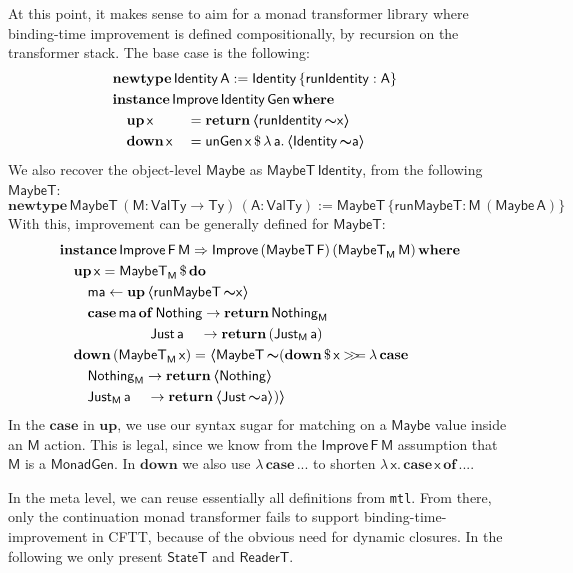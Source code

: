 \documentclass[acmsmall,screen,review,anonymous]{acmart}
\newcommand{\mit}[1]{{\mathsf{#1}}}
\newcommand{\msf}[1]{{\mathsf{#1}}}
\newcommand{\mbf}[1]{{\mathbf{#1}}}
\newcommand{\bs}[1]{\boldsymbol{#1}}
\newcommand{\mdo}{\mbf{do}\,}
\newcommand{\ind}{\hspace{1em}}
\newcommand{\return}{\mbf{return}\,}
\newcommand{\lam}{\lambda\,}
\newcommand{\where}{\mbf{where}}
\newcommand{\M}{\msf{M}}
\newcommand{\of}{\mbf{of}\,}
\newcommand{\vma}{\mathsf{ma}}
\newcommand{\vA}{\mathsf{A}}
\newcommand{\vF}{\mathsf{F}}
\newcommand{\vM}{\mathsf{M}}
\newcommand{\va}{\mathsf{a}}
\newcommand{\vx}{\mathsf{x}}
\newcommand{\ReaderT}{\msf{ReaderT}}
\newcommand{\fro}{\leftarrow}
\newcommand{\case}{\mbf{case\,}}
\newcommand{\spl}{{\bs{\sim}}}
\newcommand{\ql}{{\bs{\langle}}}
\newcommand{\qr}{{\bs{\rangle}}}
\newcommand{\bind}{\mathbin{>\!\!>\mkern-6.7mu=}}
\newcommand{\VTy}{\msf{ValTy}}
\newcommand{\Ty}{\msf{Ty}}
\newcommand{\Maybe}{\msf{Maybe}}
\newcommand{\MaybeT}{\msf{MaybeT}}
\newcommand{\Nothing}{\msf{Nothing}}
\newcommand{\Just}{\msf{Just}}
\theoremstyle{remark}
\newcommand{\mup}{\mbf{up}}
\newcommand{\mdown}{\mbf{down}}
\newcommand{\instance}{\mbf{instance}\,}
\newcommand{\Improve}{\msf{Improve}}
\newcommand{\Gen}{\msf{Gen}}
\newcommand{\unGen}{\mit{unGen}}
\newcommand{\qt}[1]{\ql#1\qr}
\newcommand{\MonadGen}{\msf{MonadGen}}
\newcommand{\RA}{\Rightarrow}
\newcommand{\StateT}{\msf{StateT}}
\newcommand{\Identity}{\msf{Identity}}
\newcommand{\runIdentity}{\mit{runIdentity}}
\newcommand{\newtype}{\mbf{newtype}\,}
\newcommand{\runMaybeT}{\mit{runMaybeT}}
\newcommand{\dlr}{\,\$\,}
\begin{document}
At this point, it makes sense to aim for a monad transformer library where
binding-time improvement is defined compositionally, by recursion on the
transformer stack. The base case is the following:
\begin{alignat*}{3}
  & \hspace{-2em}\mathrlap{\newtype \Identity\,\vA := \Identity\,\{\runIdentity : \vA\} }\\
  & \hspace{-2em}\mathrlap{\instance \Improve\,\Identity\,\Gen\,\where}\\
  & \hspace{-2em}\ind \mup\,\vx   &&= \return \qt{\runIdentity\,\spl \vx}\\
  & \hspace{-2em}\ind \mdown\,\vx &&= \unGen\,\vx \dlr \lam \va.\,\qt{\Identity\,\spl \va}
\end{alignat*}
We also recover the object-level $\Maybe$ as $\MaybeT\,\Identity$, from the following $\MaybeT$:
\[ \newtype \MaybeT\,(\vM : \VTy \to \Ty)\,(\vA : \VTy) := \MaybeT\,\{\runMaybeT : \vM\,(\Maybe\,\vA)\} \]
With this, improvement can be generally defined for $\MaybeT$:
\begin{alignat*}{3}
  &\instance \Improve\,\vF\,\vM \RA \Improve\,(\MaybeT\,\vF)\,(\MaybeT_\M\,\vM)\,\where\\
  &\ind \mup\,\vx = \MaybeT_\M \dlr \mdo\\
  &\ind\ind \vma \fro \mup\,\qt{\runMaybeT\,\spl \vx}\\
  &\ind\ind \case \vma\,\of \Nothing \to \return \Nothing_\M\\
  &\hspace{6.5em}         \Just\,\va \hspace{1.15em}\to \return (\Just_\M\,\va)\\
  &\ind \mdown\,(\MaybeT_\M\,\vx) = \qt{\MaybeT\,\spl(\mdown \dlr \vx \bind \lam\case\\
  &\ind\ind\Nothing_\M \to \return \qt{\Nothing}\\
  &\ind\ind\Just_\M\,\va\hspace{1.15em} \to \return \qt{\Just\,\spl \va})}
\end{alignat*}
In the $\mbf{case}$ in $\mup$, we use our syntax sugar for matching on a
$\Maybe$ value inside an $\vM$ action. This is legal, since we know from the
$\Improve\,\vF\,\vM$ assumption that $\vM$ is a $\MonadGen$. In $\mdown$ we also use
$\lam\case ...$ to shorten $\lam \vx.\,\case \vx\,\of ...$.

In the meta level, we can reuse essentially all definitions from \texttt{mtl}.
From there, only the continuation monad transformer fails to support
binding-time-improvement in CFTT, because of the obvious need for dynamic
closures. In the following we only present $\StateT$ and $\ReaderT$.
\end{document}
